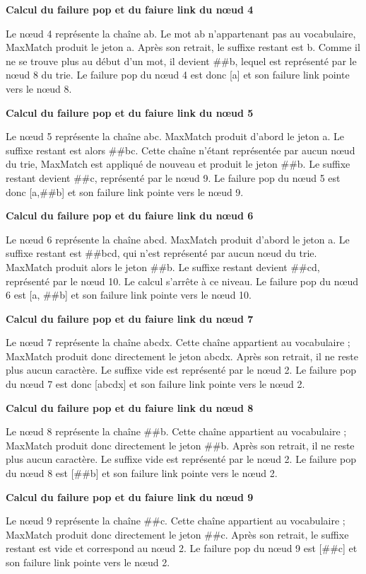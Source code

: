 \documentclass[12pt,a4paper]{report}
\begin{document}
	\textbf{Calcul du failure pop et du faiure link du nœud 4}
	
	Le nœud 4 représente la chaîne ab. Le mot ab n'appartenant pas au vocabulaire, MaxMatch produit le jeton a. Après son retrait, le suffixe restant est b. Comme il ne se trouve plus au début d'un mot, il devient \#\#b, lequel est représenté par le nœud 8 du trie. Le failure pop du nœud 4 est donc [a] et son failure link pointe vers le nœud 8.
	
	\textbf{Calcul du failure pop et du faiure link du nœud 5}
	
	Le nœud 5 représente la chaîne abc. MaxMatch produit d'abord le jeton a. Le suffixe restant est alors \#\#bc. Cette chaîne n'étant représentée par aucun nœud du trie, MaxMatch est appliqué de nouveau et produit le jeton \#\#b. Le suffixe restant devient \#\#c, représenté par le nœud 9. Le failure pop du nœud 5 est donc [a,\#\#b] et son failure link pointe vers le nœud 9.
	
	\textbf{Calcul du failure pop et du faiure link du nœud 6}
	
	Le nœud 6 représente la chaîne abcd. MaxMatch produit d'abord le jeton a. Le suffixe restant est \#\#bcd, qui n'est représenté par aucun nœud du trie. MaxMatch produit alors le jeton \#\#b. Le suffixe restant devient \#\#cd, représenté par le nœud 10. Le calcul s'arrête à ce niveau. Le failure pop du nœud 6 est [a, \#\#b] et son failure link pointe vers le nœud 10.
	
	\textbf{Calcul du failure pop et du faiure link du nœud 7}
	
	Le nœud 7 représente la chaîne abcdx. Cette chaîne appartient au vocabulaire ; MaxMatch produit donc directement le jeton abcdx. Après son retrait, il ne reste plus aucun caractère. Le suffixe vide est représenté par le nœud 2. Le failure pop du nœud 7 est donc [abcdx] et son failure link pointe vers le nœud 2.
	
	\textbf{Calcul du failure pop et du faiure link du nœud 8}
	
	Le nœud 8 représente la chaîne \#\#b. Cette chaîne appartient au vocabulaire ; MaxMatch produit donc directement le jeton \#\#b. Après son retrait, il ne reste plus aucun caractère. Le suffixe vide est représenté par le nœud 2. Le failure pop du nœud 8 est [\#\#b] et son failure link pointe vers le nœud 2.
	
	\textbf{Calcul du failure pop et du faiure link du nœud 9}
	
	Le nœud 9 représente la chaîne \#\#c. Cette chaîne appartient au vocabulaire ; MaxMatch produit donc directement le jeton \#\#c. Après son retrait, le suffixe restant est vide et correspond au nœud 2. Le failure pop du nœud 9 est [\#\#c] et son failure link pointe vers le nœud 2.
	
\end{document}
